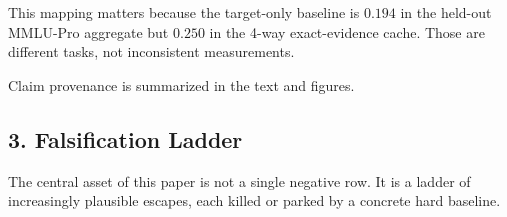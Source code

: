 \documentclass{article}
\begin{document}
This mapping matters because the target-only baseline is \(0.194\)
in the held-out MMLU-Pro aggregate but \(0.250\) in the 4-way
exact-evidence cache. Those are different tasks, not inconsistent
measurements.

Claim provenance is summarized in the text and figures.

\hypertarget{falsification-ladder}{%
\subsection{3. Falsification Ladder}\label{falsification-ladder}}

The central asset of this paper is not a single negative row. It is a
ladder of increasingly plausible escapes, each killed or parked by a
concrete hard baseline.

\begingroup\small
\end{document}
